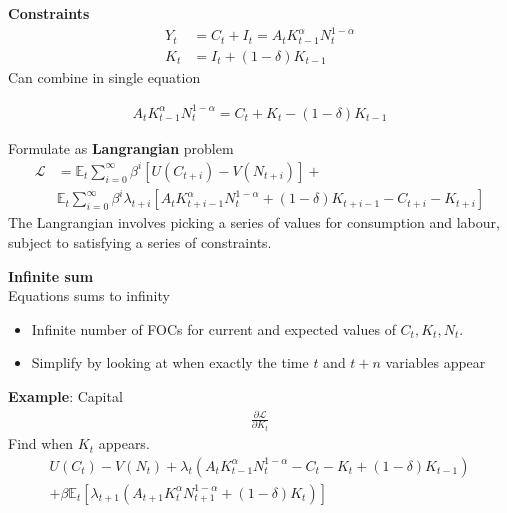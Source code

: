 \documentclass{beamer}
\begin{document}
\begin{frame}
  \textbf{Constraints}  
\begin{align}
  Y_t &= C_t + I_t = A_tK^\alpha_{t-1}N^{1-\alpha}_t\\ \nonumber
  K_t &= I_t + (1-\delta)K_{t-1}
\end{align}
 Can combine in single equation

\begin{align}
  A_tK^\alpha_{t-1}N^{1-\alpha}_t=C_t + K_t - (1-\delta)K_{t-1}
\end{align}
\end{frame}

\begin{frame}
Formulate as  \textbf{Langrangian} problem 
\begin{align}
  \mathcal{L} &= \mathbb{E}_t \sum^{\infty}_{i=0}\beta^i[U(C_{t+i}) - V(N_{t+i})] +\\ \nonumber
  & \mathbb{E}_t \sum^{\infty}_{i=0}\beta^i \lambda_{t+i} [A_tK^\alpha_{t+i-1}N^{1-\alpha}_t + (1-\delta)K_{t+i-1} - C_{t+i} - K_{t+i}]
\end{align}
 The Langrangian involves picking a series of values for consumption and labour, subject to satisfying a series of constraints. 
\end{frame}

\begin{frame}
  \textbf{Infinite sum}\\
  Equations sums to infinity
  \begin{itemize}
    \item Infinite number of FOCs for current and expected values of $C_t, K_t,N_t$.
    \item Simplify by looking at when exactly the time $t$ and $t+n$ variables appear
  \end{itemize}  
\end{frame}

\begin{frame}
\textbf{Example}: Capital
\begin{align}
    \frac{\partial \mathcal{L}}{\partial K_t}
  \end{align}
  Find when $K_t$ appears.
\begin{align}
  U(C_t)-V(N_t)+ \lambda_t(A_tK^\alpha_{t-1}N^{1-\alpha}_t -C_t -K_t + (1-\delta)K_{t-1}) \\ \nonumber
  + \beta \mathbb{E}_t[\lambda_{t+1}(A_{t+1}K^\alpha_{t}N^{1-\alpha}_{t+1}+(1-\delta)K_t)]
\end{align}
\end{frame}
\end{document}
